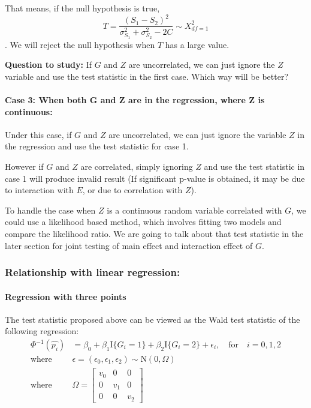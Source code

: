 \documentclass[]{article}
\let\oldparagraph\paragraph
\renewcommand{\paragraph}[1]{\oldparagraph{#1}\mbox{}}
\begin{document}
That means, if the null hypothesis is true,
\[ T = \frac{(S_1-S_2)^2}{\sigma_{S_1}^2+\sigma_{S_2}^2 -2C} \sim X^2_{df=1}\].
We will reject the null hypothesis when \(T\) has a large value.

\textbf{Question to study:} If \(G\) and \(Z\) are uncorrelated, we can
just ignore the \(Z\) variable and use the test statistic in the first
case. Which way will be better?

\hypertarget{case-3-when-both-g-and-z-are-in-the-regression-where-z-is-continuous}{%
\paragraph{Case 3: When both G and Z are in the regression, where Z is
continuous:}\label{case-3-when-both-g-and-z-are-in-the-regression-where-z-is-continuous}}

Under this case, if \(G\) and \(Z\) are uncorrelated, we can just ignore
the variable \(Z\) in the regression and use the test statistic for case
1.

However if \(G\) and \(Z\) are correlated, simply ignoring \(Z\) and use
the test statistic in case 1 will produce invalid result (If significant
p-value is obtained, it may be due to interaction with \(E\), or due to
correlation with \(Z\)).

To handle the case when \(Z\) is a continuous random variable correlated
with \(G\), we could use a likelihood based method, which involves
fitting two models and compare the likelihood ratio. We are going to
talk about that test statistic in the later section for joint testing of
main effect and interaction effect of \(G\).

\hypertarget{relationship-with-linear-regression}{%
\subsubsection{Relationship with linear
regression:}\label{relationship-with-linear-regression}}

\hypertarget{regression-with-three-points}{%
\paragraph{Regression with three
points}\label{regression-with-three-points}}

The test statistic proposed above can be viewed as the Wald test
statistic of the following regression:
\begin{equation}\label{eqn:asWaldTest}
\begin{aligned}
\Phi^{-1}(\hat{p_{i}}) &= \beta_0 + \beta_1 \text{I}\{G_i = 1\} + \beta_2 \text{I}\{G_i = 2\} + \epsilon_i,\quad \text{for} \quad i = 0,1,2 \\
\text{where} \quad &\epsilon = (\epsilon_0, \epsilon_1, \epsilon_2) \sim \text{N}(0,\Omega) \\
\text{where} \quad &\Omega = \begin{bmatrix} v_0 & 0 & 0 \\ 0 & v_1 & 0 \\ 0 & 0 & v_2 \end{bmatrix}
\end{aligned}
\end{equation}
\end{document}

